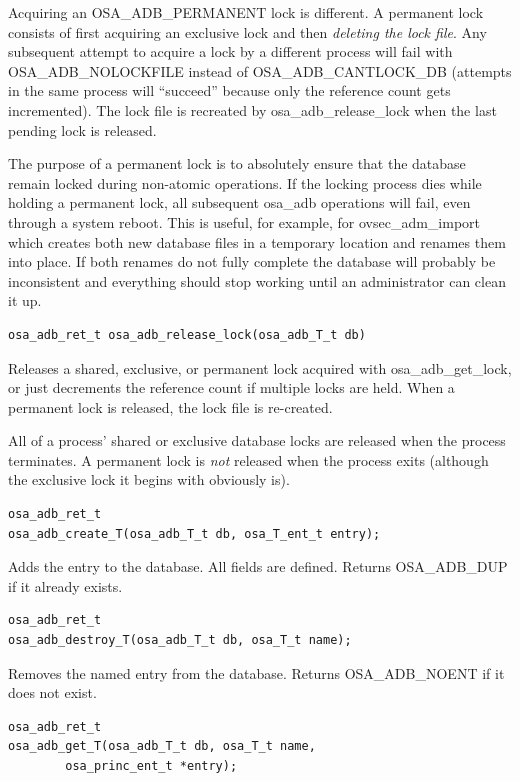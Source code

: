 Acquiring an OSA_ADB_PERMANENT lock is different.  A permanent lock
consists of first acquiring an exclusive lock and then {\it deleting
the lock file}.  Any subsequent attempt to acquire a lock by a
different process will fail with OSA_ADB_NOLOCKFILE instead of
OSA_ADB_CANTLOCK_DB (attempts in the same process will ``succeed''
because only the reference count gets incremented).  The lock file is
recreated by osa_adb_release_lock when the last pending lock is released.

The purpose of a permanent lock is to absolutely ensure that the
database remain locked during non-atomic operations.  If the locking
process dies while holding a permanent lock, all subsequent osa_adb
operations will fail, even through a system reboot.  This is useful,
for example, for ovsec_adm_import which creates both new database
files in a temporary location and renames them into place.  If both
renames do not fully complete the database will probably be
inconsistent and everything should stop working until an administrator
can clean it up.

\begin{verbatim}
osa_adb_ret_t osa_adb_release_lock(osa_adb_T_t db)
\end{verbatim}

Releases a shared, exclusive, or permanent lock acquired with
osa_adb_get_lock, or just decrements the reference count if multiple
locks are held.  When a permanent lock is released, the lock file is
re-created.

All of a process' shared or exclusive database locks are released when
the process terminates.  A permanent lock is {\it not} released when
the process exits (although the exclusive lock it begins with
obviously is).

\begin{verbatim}
osa_adb_ret_t
osa_adb_create_T(osa_adb_T_t db, osa_T_ent_t entry);
\end{verbatim}
%
Adds the entry to the database.  All fields are defined.  Returns
OSA_ADB_DUP if it already exists.

\begin{verbatim}
osa_adb_ret_t
osa_adb_destroy_T(osa_adb_T_t db, osa_T_t name);
\end{verbatim}

Removes the named entry from the database.  Returns OSA_ADB_NOENT if
it does not exist.

\begin{verbatim}
osa_adb_ret_t
osa_adb_get_T(osa_adb_T_t db, osa_T_t name,
        osa_princ_ent_t *entry);
\end{verbatim}

